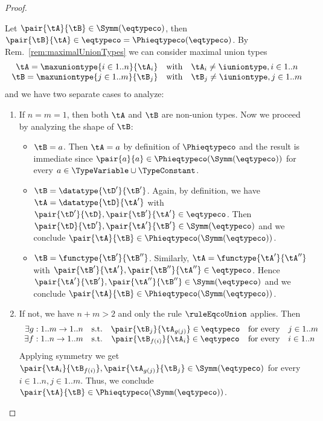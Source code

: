 \begin{proof}
\begin{itemize}
  Let $\pair{\tA}{\tB} \in \Symm\!\left(\eqtypeco\right)$, then
  $\pair{\tB}{\tA} \in \mathbin{\eqtypeco} =
  \Phieqtypeco\!\left(\eqtypeco\right)$. By Rem.~\ref{rem:maximalUnionTypes} we
  can consider maximal union types $$
\begin{array}{r@{\quad\text{with}\quad}l}
\tA = \maxuniontype{i \in 1..n}{\tA_i} & \tA_i \neq \iuniontype, i \in 1..n \\
\tB = \maxuniontype{j \in 1..m}{\tB_j} & \tB_j \neq \iuniontype, j \in 1..m
\end{array} $$ and we have two separate cases to analyze:
  \begin{enumerate}
    \item If $n = m = 1$, then both $\tA$ and $\tB$ are non-union types. Now we
    proceed by analyzing the shape of $\tB$:
    \begin{itemize}
      \item $\tB = a$. Then $\tA = a$ by definition of $\Phieqtypeco$ and the
      result is immediate since $\pair{a}{a} \in
      \Phieqtypeco\!\left(\Symm(\eqtypeco)\right)$ for every $a \in
      \TypeVariable \cup \TypeConstant$.
      
      \item $\tB = \datatype{\tD'}{\tB'}$. Again, by definition, we have
      $\tA = \datatype{\tD}{\tA'}$ with $\pair{\tD'}{\tD}, \pair{\tB'}{\tA'}
      \in \mathbin{\eqtypeco}$. Then $\pair{\tD}{\tD'}, \pair{\tA'}{\tB'} \in
      \Symm\!\left(\eqtypeco\right)$ and we conclude $\pair{\tA}{\tB} \in
      \Phieqtypeco\!\left(\Symm(\eqtypeco)\right)$.
      
      \item $\tB = \functype{\tB'}{\tB''}$. Similarly, $\tA =
      \functype{\tA'}{\tA''}$ with $ \pair{\tB'}{\tA'}, \pair{\tB''}{\tA''} \in
      \mathbin{\eqtypeco}$. Hence $\pair{\tA'}{\tB'}, \pair{\tA''}{\tB''} \in
      \Symm\!\left(\eqtypeco\right)$ and we conclude $\pair{\tA}{\tB} \in
      \Phieqtypeco\!\left(\Symm(\eqtypeco)\right)$.
    \end{itemize}
    
    \item If not, we have $n + m > 2$ and only the rule $\ruleEqcoUnion$
    applies. Then $$
\begin{array}{r@{\quad\text{s.t.}\quad}c@{\quad\text{for every}\quad}l}
\exists g : 1..m \to 1..n & \pair{\tB_j}{\tA_{g(j)}} \in \mathbin{\eqtypeco} & j \in 1..m \\
\exists f : 1..n \to 1..m & \pair{\tB_{f(i)}}{\tA_i} \in \mathbin{\eqtypeco} & i \in 1..n
\end{array} $$ Applying symmetry we get $\pair{\tA_i}{\tB_{f(i)}},
    \pair{\tA_{g(j)}}{\tB_j} \in \Symm\!\left(\eqtypeco\right)$ for every
    $i \in 1..n, j \in 1..m$. Thus, we conclude $\pair{\tA}{\tB} \in
    \Phieqtypeco\!\left(\Symm(\eqtypeco)\right)$.
  \end{enumerate}
  

\end{itemize}
\end{proof}
